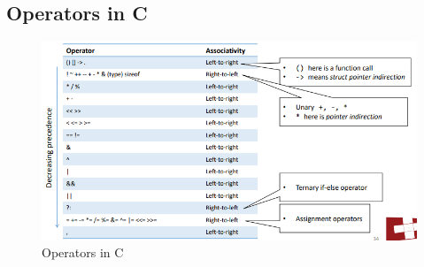 \documentclass[a4paper,10pt]{article}
\begin{document}
\subsection{Operators in C}
\begin{figure}[h]
    \centering
    \includegraphics[width=1\linewidth]{e13.png}
    \caption{Operators in C}
    \label{fig:enter-label}
\end{figure}
\end{document}
